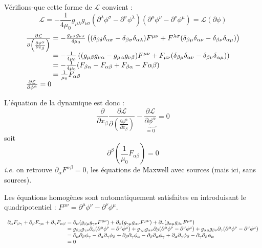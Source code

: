 Vérifions-que cette forme de $\mathcal{L}$ convient :
$$
		\mathcal{L}=-\frac{1}{4\mu_0}g_{\mu\lambda}g_{\nu\sigma}
			(\partial^{\lambda}\phi^{\sigma}-\partial^{\sigma}\phi^{\lambda})
			(\partial^\mu \phi^\nu-\partial^\nu \phi^\mu)
			=\mathcal{L}(\partial\phi)
$$
$$
	\begin{array}{r@{\;}l}
		\frac{\partial\mathcal{L}}{\partial\left(\frac{\partial\phi^{\alpha}}{\partial x_{\beta}}\right)}
			&=-\frac{g_{\mu\lambda}g_{\nu\sigma}}{4\mu_0}\left(
			(\delta_{\beta\delta}\delta_{\alpha\sigma}-\delta_{\beta\sigma}\delta_{\alpha\lambda})F^{\mu\nu}+
			F^{\lambda\sigma}(\delta_{\beta\mu}\delta_{\alpha\nu}-\delta_{\beta\nu}\delta_{\alpha\mu})\right)\\
			&=-\frac{1}{4\mu_0}\left(
			(g_{\mu\beta}g_{\nu\alpha}-g_{\mu\alpha}g_{\nu\beta})F^{\mu\nu}+
			F_{\mu\nu}(\delta_{\beta\mu}\delta_{\alpha\nu}-\delta_{\beta\nu}\delta_{\alpha\mu})\right)\\
			&=-\frac{1}{4\mu_0}(F_{\beta\alpha}-F_{\alpha\beta}+F_{\beta\alpha}-F{\alpha\beta})\\
			&=\frac{1}{\mu_0}F_{\alpha\beta}\\
		\multicolumn{2}{l}{\frac{\partial\mathcal{L}}{\partial \phi^{\alpha}}=0}
	\end{array}
$$

L'équation de la dynamique est donc :
$$
	\frac{\partial}{\partial x_{\beta}}\frac{\partial\mathcal{L}}{\partial\left(\frac{\partial\phi^{\alpha}}{\partial x_{\beta}}\right)}-\underbrace{\frac{\partial\mathcal{L}}{\partial \phi^{\alpha}}}_{=0}=0
$$
soit
$$
	\partial^{\beta}\left(\frac{1}{\mu_0}F_{\alpha\beta}\right)=0
$$
\emph{i.e.} on retrouve $\partial_{\alpha}F^{\alpha\beta}=0$, les équations de Maxwell avec sources (mais ici, sans sources).

Les équations homogènes sont automatiquement satisfaites en introduisant le quadripotentiel : $F^{\mu\nu}=\partial^{\mu}\phi^{\nu}-\partial^{\nu}\phi^\mu$.

$$
	\begin{array}{r@{\;}l}
		\partial_\alpha F_{\beta\gamma} + \partial_\beta F_{\gamma\alpha} + \partial_\gamma F_{\alpha\beta}
		&= \partial_{\alpha}(g_{\beta\mu}g_{\gamma\nu}F^{\mu\nu})
			+ \partial_{\beta}(g_{\gamma\mu}g_{\alpha\nu}F^{\mu\nu})
			+ \partial_{\gamma}(g_{\alpha\mu}g_{\beta\nu}F^{\mu\nu})\\
		&= g_{\beta\mu}g_{\gamma\nu}\partial_\alpha (\partial^{\mu}\phi^{\nu}-\partial^{\nu}\phi^\mu)
			+ g_{\gamma\mu}g_{\alpha\nu}\partial_{\beta} (\partial^{\mu}\phi^{\nu}-\partial^{\nu}\phi^\mu)
			+ g_{\alpha\mu}g_{\beta\nu}\partial_{\gamma}(\partial^{\mu}\phi^{\nu}-\partial^{\nu}\phi^\mu)\\
		&= \partial_{\alpha}\partial_{\beta}\phi_{\gamma}
			- \partial_{\alpha}\partial_{\gamma}\phi_{\beta}
			+ \partial_{\beta}\partial_{\gamma}\phi_{\alpha}
			- \partial_{\beta}\partial_{\alpha}\phi_{\gamma}
			+ \partial_{\alpha}\partial_{\gamma}\phi_{\beta}
			- \partial_{\gamma}\partial_{\beta}\phi_{\alpha}\\
		 &= 0
	\end{array}
$$

